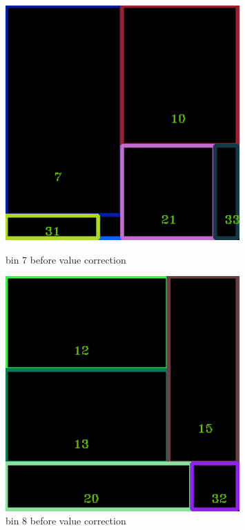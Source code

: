 \documentclass[11pt]{article}
\begin{document}
    \begin{figure}
    \begin{minipage}[htb]{0.33\linewidth}
    \centering
    \includegraphics[width=0.8\textwidth]{FIGS/1/output7.png}
    \caption{bin 7 before value correction}
    \label{skyline}
    \end{minipage}
    \begin{minipage}[htb]{0.33\linewidth}
    \centering
    \includegraphics[width=0.8\textwidth]{FIGS/1/output8.png}
    \caption{bin 8 before value correction}
    \label{skyline}
    \end{minipage}

\end{figure}
\end{document}
